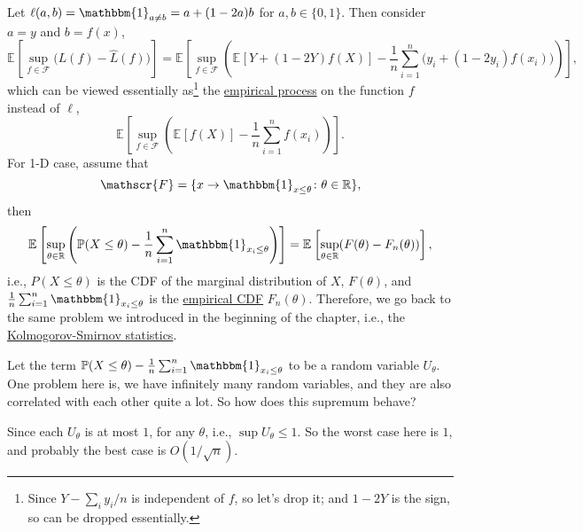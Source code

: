 \begin{eg}
	Let \(\ell (a, b) = \mathbbm{1}_{a \neq b} = a + (1 - 2a)b\) for \(a, b\in \{ 0, 1 \} \). Then consider \(a = y\) and \(b = f(x)\),
	\[
		\mathbb{E}_{}\left[\sup _{f\in \mathscr{F} } \big( L(f) - \hat{L} (f) \big) \right]
		= \mathbb{E}_{}\left[\sup _{f\in \mathscr{F} } \left( \mathbb{E}_{}\left[Y + (1 - 2Y)f(X) \right] - \frac{1}{n} \sum_{i=1}^{n} \big( y_i + (1 - 2y_i)f(x_i) \big) \right)  \right],
	\]
	which can be viewed essentially as\footnote{Since \(Y - \sum_{i} y_i / n\) is independent of \(f\), so let's drop it; and \(1 - 2Y\) is the sign, so can be dropped essentially.} the \hyperref[def:EP]{empirical process} on the function \(f\) instead of \(\ell \),
	\[
		\mathbb{E}_{}\left[\sup _{f\in \mathscr{F} } \left( \mathbb{E}_{}\left[f(X) \right] - \frac{1}{n}\sum_{i=1}^{n} f(x_i) \right)  \right].
	\]
	For 1-D case, assume that
	\[
		\mathscr{F} = \{ x \to \mathbbm{1}_{x \leq \theta } \colon \theta \in \mathbb{R}  \},
	\]
	then
	\[
		\mathbb{E}_{}\left[\sup _{\theta \in \mathbb{R} } \left( \mathbb{P} (X \leq \theta ) - \frac{1}{n} \sum_{i=1}^{n} \mathbbm{1}_{x_i \leq \theta } \right) \right]
		= \mathbb{E}_{}\left[\sup _{\theta \in \mathbb{R} } (F(\theta ) - F_n(\theta )) \right] ,
	\]
	i.e., \(P(X \leq \theta )\) is the CDF of the marginal distribution of \(X\), \(F(\theta )\), and \(\frac{1}{n}\sum_{i=1}^{n} \mathbbm{1}_{x_i \leq \theta } \) is the \hyperref[def:empirical-CDF]{empirical CDF} \(F_n(\theta )\). Therefore, we go back to the same problem we introduced in the beginning of the chapter, i.e., the \hyperref[def:Kolmogorov-Smirnov-statistics]{Kolmogorov-Smirnov statistics}.

	Let the term \(\mathbb{P} (X \leq \theta ) - \frac{1}{n}\sum_{i=1}^{n} \mathbbm{1}_{x_i \leq \theta } \) to be a random variable \(U_\theta \). One problem here is, we have infinitely many random variables, and they are also correlated with each other quite a lot. So how does this supremum behave?

	Since each \(U_\theta \) is at most \(1\), for any \(\theta \), i.e., \(\sup U_\theta \leq 1\). So the worst case here is \(1\), and probably the best case is \(O(1 / \sqrt{n} )\).
\end{eg}